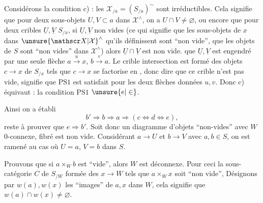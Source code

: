 Considérons la condition c) : les $\mathscr X_{/a}=(S_{/a})^{\sim}$ sont irréductibles. Cela signifie que pour deux sous-objets  $U,V\subset a$ dans $\mathscr X^{\wedge}$, on a $U\cap V\ne\varnothing$, ou encore que pour deux cribles
$\underline U,\underline V$  $S_{/x}$, si $\underline U,\underline V$ non vides (ce qui signifie que les sous-objets de $x$ dans $\unsure{\mathscr X|\mathcal X}^{\wedge}$ qu'ils définissent sont ``non vide'',  que les objets de $S$ sont ``non vides''  dans $\mathscr X^{\wedge}$) alors $\underline U\cap\underline V$ est non vide.  que $\underline U,\underline V$ est engendré  par une seule flèche $a\overset u\longrightarrow x$, $b\overset v\longrightarrow a$. Le  crible intersection est formé des objets $c\longrightarrow x$ de $S_{/x}$ tels que $c\longrightarrow x$ se factorise  en
, donc  dire que ce crible n'est pas vide, signifie  que $\mathrm{PS}1$ est satisfait pour les deux flèches données $u,v$. Donc c) équivaut : la condition $\mathrm{PS}1$ $\unsure{e|\in}$.

Ainsi on a établi
\[
b'\Longrightarrow b\Longrightarrow a\Longrightarrow(c\Longleftrightarrow d\Longleftrightarrow e),
\]
reste à prouver que $e\Longrightarrow b'$. Soit donc
un diagramme d'objets ``non-vides''  avec $W$ $0$-connexe,    fibré est non vide.  Considérant $a\longrightarrow U$ et $b\longrightarrow V$ avec $a,b\in S$, on est ramené au cas où $U=a$, $V=b$  dans $S$.

Prouvons que si $a\times_W b$ est ``vide'', alors $W$ est déconnexe. Pour ceci   la sous-catégorie $C$ de $S_{/W}$ formée des $x\longrightarrow W$ tels que $a\times_W x$ soit ``non vide'',  Désignons par $w(a),w(x)$ les ``images'' de $a,x$ dans $W$, cela signifie que $w(a)\cap w(x)\ne\varnothing$.

